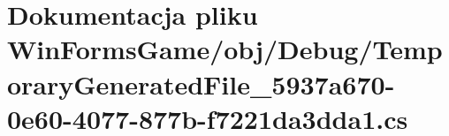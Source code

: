 \hypertarget{_win_forms_game_2obj_2_debug_2_temporary_generated_file__5937a670-0e60-4077-877b-f7221da3dda1_8cs}{}\section{Dokumentacja pliku Win\+Forms\+Game/obj/\+Debug/\+Temporary\+Generated\+File\+\_\+5937a670-\/0e60-\/4077-\/877b-\/f7221da3dda1.cs}
\label{_win_forms_game_2obj_2_debug_2_temporary_generated_file__5937a670-0e60-4077-877b-f7221da3dda1_8cs}
